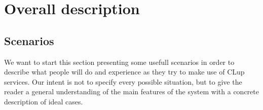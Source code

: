 \section{Overall description}
\label{sect:overalldescription}



\subsection{Scenarios}
\label{subsect:scenarios}

We want to start this section presenting some usefull scenarios in order to describe what people will do and experience as they try to make use of CLup services. Our intent is not to specify every possible situation, but to give the reader a general understanding of the main features of the system with a concrete description of ideal cases.
 
